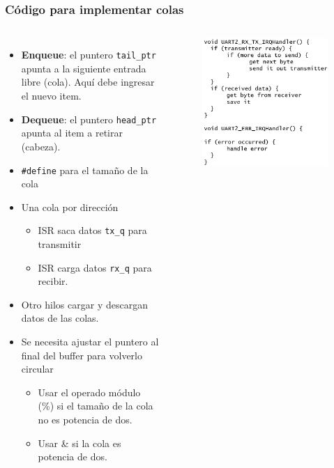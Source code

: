 \documentclass[10.5pt,scale=1.0,t,aspectratio=169,hyperref={pdfpagelabels=false}]{beamer}
\begin{document}
\begin{frame}
	\frametitle{Código para implementar colas}
	{\small
	\begin{columns}
		\begin{itemize}
			\setlength\itemsep{0em}
			\item \textbf{Enqueue}: el puntero \texttt{tail\_ptr} apunta a la siguiente entrada libre (cola). Aquí debe ingresar el nuevo item.
			\item \textbf{Dequeue}: el puntero \texttt{head\_ptr} apunta al item a retirar (cabeza).
			\item \texttt{\#define} para el tamaño de la cola 
			\item Una cola por dirección
			\begin{itemize}
				\setlength\itemsep{0em}
				\item ISR saca datos \texttt{tx\_q} para transmitir
				\item ISR carga datos \texttt{rx\_q} para recibir.
			\end{itemize}
			\item Otro hilos cargar y descargan datos de las colas.
			\item Se necesita ajustar el puntero al final del buffer para volverlo circular
			\begin{itemize}
				\item Usar el operado módulo (\%) si el tamaño de la cola no es potencia de dos.
				\item Usar \& si la cola es potencia de dos.
			\end{itemize}
		\end{itemize}
		
		\begin{figure}
			\centering
			\includegraphics[scale=0.35]{09_ISRIRQ}
		\end{figure}
	\end{columns}
}
\end{frame}
\end{document}
